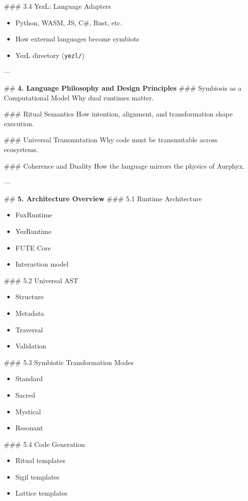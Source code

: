 \documentclass[12pt, a4paper]{book}
\begin{document}
\#\#\# 3.4 YezL: Language Adapters  
\begin{itemize}
  \item Python, WASM, JS, C\#, Rust, etc.  
  \item How external languages become symbiots  
  \item YezL directory (\texttt{yezl/})
\end{itemize}

---

\#\# \textbf{4. Language Philosophy and Design Principles}
\#\#\# Symbiosis as a Computational Model  
Why dual runtimes matter.

\#\#\# Ritual Semantics  
How intention, alignment, and transformation shape execution.

\#\#\# Universal Transmutation  
Why code must be transmutable across ecosystems.

\#\#\# Coherence and Duality  
How the language mirrors the physics of Aurphyx.

---

\#\# \textbf{5. Architecture Overview}
\#\#\# 5.1 Runtime Architecture  
\begin{itemize}
  \item FuxRuntime  
  \item YezRuntime  
  \item FUTE Core  
  \item Interaction model
\end{itemize}

\#\#\# 5.2 Universal AST  
\begin{itemize}
  \item Structure  
  \item Metadata  
  \item Traversal  
  \item Validation
\end{itemize}

\#\#\# 5.3 Symbiotic Transformation Modes  
\begin{itemize}
  \item Standard  
  \item Sacred  
  \item Mystical  
  \item Resonant  
\end{itemize}

\#\#\# 5.4 Code Generation  
\begin{itemize}
  \item Ritual templates  
  \item Sigil templates  
  \item Lattice templates  
\end{itemize}
\end{document}
